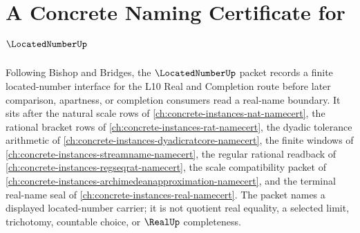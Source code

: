 \chapter{A Concrete Naming Certificate for $\LocatedNumberUp$}
\label{ch:concrete-instances-located-number-namecert}

Following Bishop and Bridges, the $\LocatedNumberUp$ packet records a finite located-number interface for the L10 Real and Completion route before later comparison, apartness, or completion consumers read a real-name boundary. It sits after the natural scale rows of \autoref{ch:concrete-instances-nat-namecert}, the rational bracket rows of \autoref{ch:concrete-instances-rat-namecert}, the dyadic tolerance arithmetic of \autoref{ch:concrete-instances-dyadicratcore-namecert}, the finite windows of \autoref{ch:concrete-instances-streamname-namecert}, the regular rational readback of \autoref{ch:concrete-instances-regseqrat-namecert}, the scale compatibility packet of \autoref{ch:concrete-instances-archimedeanapproximation-namecert}, and the terminal real-name seal of \autoref{ch:concrete-instances-real-namecert}. The packet names a displayed located-number carrier; it is not quotient real equality, a selected limit, trichotomy, countable choice, or $\RealUp$ completeness.

